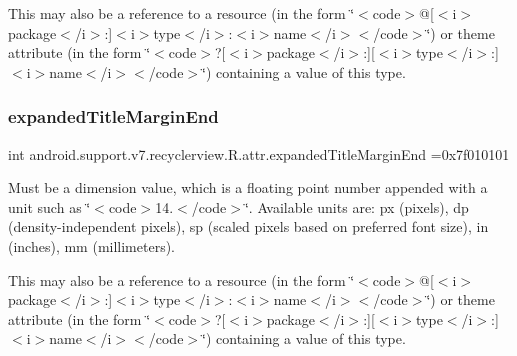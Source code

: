 This may also be a reference to a resource (in the form \char`\"{}$<$code$>$@\mbox{[}$<$i$>$package$<$/i$>$\+:\mbox{]}$<$i$>$type$<$/i$>$\+:$<$i$>$name$<$/i$>$$<$/code$>$\char`\"{}) or theme attribute (in the form \char`\"{}$<$code$>$?\mbox{[}$<$i$>$package$<$/i$>$\+:\mbox{]}\mbox{[}$<$i$>$type$<$/i$>$\+:\mbox{]}$<$i$>$name$<$/i$>$$<$/code$>$\char`\"{}) containing a value of this type. \mbox{\label{classandroid_1_1support_1_1v7_1_1recyclerview_1_1R_1_1attr_abcaa9e590810d90fdce68c9d49968002}} 
\subsubsection{\texorpdfstring{expanded\+Title\+Margin\+End}{expandedTitleMarginEnd}}
{\footnotesize\ttfamily int android.\+support.\+v7.\+recyclerview.\+R.\+attr.\+expanded\+Title\+Margin\+End =0x7f010101\hspace{0.3cm}{\ttfamily [static]}}

Must be a dimension value, which is a floating point number appended with a unit such as \char`\"{}$<$code$>$14.\+5sp$<$/code$>$\char`\"{}. Available units are\+: px (pixels), dp (density-\/independent pixels), sp (scaled pixels based on preferred font size), in (inches), mm (millimeters). 

This may also be a reference to a resource (in the form \char`\"{}$<$code$>$@\mbox{[}$<$i$>$package$<$/i$>$\+:\mbox{]}$<$i$>$type$<$/i$>$\+:$<$i$>$name$<$/i$>$$<$/code$>$\char`\"{}) or theme attribute (in the form \char`\"{}$<$code$>$?\mbox{[}$<$i$>$package$<$/i$>$\+:\mbox{]}\mbox{[}$<$i$>$type$<$/i$>$\+:\mbox{]}$<$i$>$name$<$/i$>$$<$/code$>$\char`\"{}) containing a value of this type. \mbox{\label{classandroid_1_1support_1_1v7_1_1recyclerview_1_1R_1_1attr_aaded93526bd357496fd53b69e637cfb5}} 
